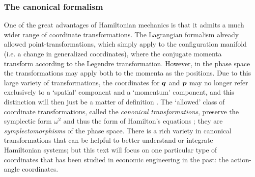 \subsubsection{The canonical formalism}
One of the great advantages of Hamiltonian mechanics is that it admits a much wider range of coordinate transformations. The Lagrangian formalism already allowed point-transformations, which simply apply to the configuration manifold (i.e. a change in generalized coordinates), where the conjugate momenta transform according to the Legendre transformation. However, in the phase space the transformations may apply both to the momenta as the positions. Due to this large variety of transformations, the coordinates for \(\vb*{q}\) and \(\vb*{p}\) may no longer refer exclusively to a `spatial' component and a `momentum' component, and this distinction will then just be a matter of definition \cite{Landau1960}. The `allowed' class of coordinate transformations, called the \emph{canonical transformations}, preserve the symplectic form $\omega^2$ and thus the form of Hamilton's equations \cite{Arnold1989}; they are \emph{symplectomorphisms} of the phase space. There is a rich variety in canonical transformations that can be helpful to better understand or integrate Hamiltonian systems; but this text will focus on one particular type of coordinates that has been studied in economic engineering in the past: the action-angle coordinates.

